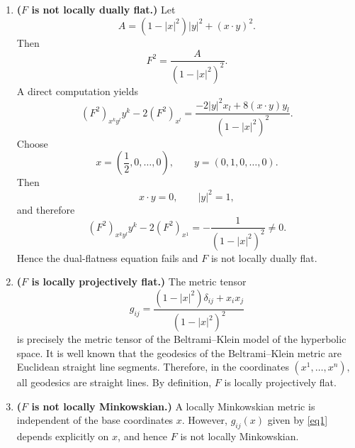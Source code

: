 \documentclass[12pt]{article}
\theoremstyle{definition}
\begin{document}
											\begin{enumerate}
												\item[1.] \textbf{(\(F\) is not locally dually flat.)} Let
												\[
												A=(1-|x|^{2})|y|^{2}+(x\cdot y)^{2}.
												\]
												Then
												\[
												F^{2}=\frac{A}{(1-|x|^{2})^{2}}.
												\]
												A direct computation yields
												\[
												(F^{2})_{x^{k}y^{l}}y^{k}-2(F^{2})_{x^{l}}
												=
												\frac{-2|y|^{2}x_{l}
													+8(x\cdot y)y_{l}}
													{(1-|x|^{2})^{2}}.
													\]
													Choose
													\[
													x=\left(\frac12,0,\ldots,0\right),
													\qquad
													y=(0,1,0,\ldots,0).
													\]
													Then
													\[
													x\cdot y=0,
													\qquad
													|y|^{2}=1,
													\]
													and therefore
													\[
													(F^{2})_{x^{k}y^{l}}y^{k}-2(F^{2})_{x^{1}}
													=
													-\frac{1}{(1-|x|^{2})^{2}}
													\neq 0.
													\]
													Hence the dual-flatness equation fails and \(F\) is not locally dually flat.
													
													\item[2.] \textbf{(\(F\) is locally projectively flat.)} The metric tensor
													\begin{equation}\label{eq1}
													g_{ij}
													=
													\frac{(1-|x|^{2})\delta_{ij}+x_{i}x_{j}}
													{(1-|x|^{2})^{2}}   
													\end{equation}
													is precisely the metric tensor of the Beltrami--Klein model of the hyperbolic space. It is well known that the geodesics of the Beltrami--Klein metric are Euclidean straight line segments. Therefore, in the coordinates $(x^{1},\ldots,x^{n}),$
													all geodesics are straight lines. By definition, \(F\) is locally projectively flat.
													
													\item[3.] \textbf{(\(F\) is not locally Minkowskian.)} A locally Minkowskian metric is independent of the base coordinates \(x\). However, $g_{ij}(x)$ given by \eqref{eq1} depends explicitly on \(x\), and hence \(F\) is not locally Minkowskian.
													
												\end{enumerate}
												
												
												
\end{document}
